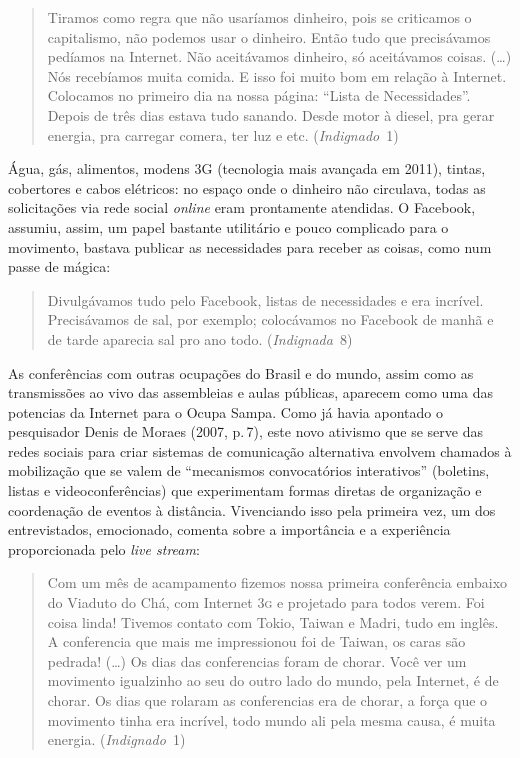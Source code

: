 \begin{quote}
Tiramos como regra que não usaríamos dinheiro, pois se criticamos o
capitalismo, não podemos usar o dinheiro. Então tudo que precisávamos
pedíamos na Internet. Não aceitávamos dinheiro, só aceitávamos coisas.
(\ldots{}) Nós recebíamos muita comida. E isso foi muito bom em relação à
Internet. Colocamos no primeiro dia na nossa página: ``Lista de
Necessidades''. Depois de três dias estava tudo sanando. Desde motor à
diesel, pra gerar energia, pra carregar comera, ter luz e etc.
(\textit{Indignado}~1)
\end{quote}

Água, gás, alimentos, modens 3G (tecnologia mais avançada em 2011),
tintas, cobertores e cabos elétricos: no espaço onde o dinheiro não
circulava, todas as solicitações via rede social \textit{online} eram prontamente
atendidas. O Facebook, assumiu, assim, um papel bastante utilitário e
pouco complicado para o movimento, bastava publicar as necessidades para
receber as coisas, como num passe de mágica:

\begin{quote}
Divulgávamos tudo pelo Facebook, listas de necessidades e era incrível.
Precisávamos de sal, por exemplo; colocávamos no Facebook de manhã e de
tarde aparecia sal pro ano todo. (\textit{Indignada}~8)
\end{quote}

As conferências com outras ocupações do Brasil e do mundo, assim como as
transmissões ao vivo das assembleias e aulas públicas, aparecem como uma
das potencias da Internet para o Ocupa Sampa. Como já havia apontado o
pesquisador Denis de Moraes (2007, p.\,7), este novo ativismo que se
serve das redes sociais para criar sistemas de comunicação alternativa
envolvem chamados à mobilização que se valem de ``mecanismos
convocatórios interativos'' (boletins, listas e videoconferências) que
experimentam formas diretas de organização e coordenação de eventos à
distância. Vivenciando isso pela primeira vez, um dos entrevistados,
emocionado, comenta sobre a importância e a experiência proporcionada
pelo \textit{live stream}:

\begin{quote}
Com um mês de acampamento fizemos nossa primeira conferência embaixo do
Viaduto do Chá, com Internet \textsc{3g} e projetado para todos verem. Foi coisa
linda! Tivemos contato com Tokio, Taiwan e Madri, tudo em inglês. A
conferencia que mais me impressionou foi de Taiwan, os caras são
pedrada! (\ldots{}) Os dias das conferencias foram de chorar. Você ver um
movimento igualzinho ao seu do outro lado do mundo, pela Internet, é de
chorar. Os dias que rolaram as conferencias era de chorar, a força que o
movimento tinha era incrível, todo mundo ali pela mesma causa, é muita
energia. (\textit{Indignado}~1)
\end{quote}

